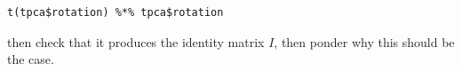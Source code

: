 \begin{lstlisting}
t(tpca$rotation) %*% tpca$rotation
\end{lstlisting}

then check that it produces the identity matrix $I$, then ponder why
this should be the case.

% 
% 
% 
% 
% 
% 
% 
% 
% 
